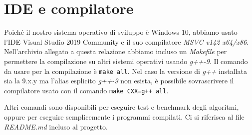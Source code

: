 \section{IDE e compilatore}
\label{cap:language-choice}

Poiché il nostro sistema operativo di sviluppo è Windows 10, abbiamo usato l'IDE Visual Studio 2019 Community e il suo compilatore \textit{MSVC v142 x64/x86}. \\

\noindent Nell'archivio allegato a questa relazione abbiamo incluso un \textit{Makefile} per permettere la compilazione su altri sistemi operativi usando \textit{g++-9}. Il comando da usare per la compilazione è \texttt{make all}. Nel caso la versione di \textit{g++} installata sia la 9.x.y ma l'alias esplicito \textit{g++-9} non esista, è possibile sovrascrivere il compilatore usato con il comando \texttt{make CXX=g++ all}.

Altri comandi sono disponibili per eseguire test e benchmark degli algoritmi, oppure per eseguire semplicemente i programmi compilati. Ci si riferisca al file \textit{README.md} incluso al progetto.
